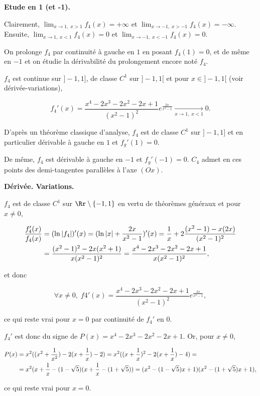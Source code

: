{\begin{enumerate}
{{{{\textbf{Etude en 1 (et -1).}

Clairement, $\lim_{x\rightarrow 1,\;x>1}f_4(x)=+\infty$ et $\lim_{x\rightarrow -1,\;x>-1}f_4(x)=-\infty$. Ensuite, $\lim_{x\rightarrow 1,\;x<1}f_4(x)=0$ et $\lim_{x\rightarrow -1,\;x<-1}f_4(x)=0$.

On prolonge $f_4$ par continuité à gauche en $1$ en posant $f_4(1)=0$, et de même en $-1$ et on étudie la dérivabilité du prolongement encore noté $f_4$.

$f_4$ est continue sur $]-1,1]$, de classe $C^1$ sur $]-1,1[$ et pour $x\in]-1,1[$ (voir dérivée-variations), 

$$f_4'(x)=\frac{x^4-2x^3-2x^2-2x+1}{(x^2-1)^2}e^{\frac{2x}{x^2-1}}\underset{x\rightarrow1,\;x<1}{\rightarrow}0.$$

D'après un théorème classique d'analyse, $f_4$ est de classe $C^1$ sur $]-1,1]$ et en particulier dérivable à gauche en $1$ et $f_g'(1)=0$.

De même, $f_4$ est dérivable à gauche en $-1$ et $f_g'(-1)=0$. $C_4$ admet en ces points des demi-tangentes parallèles à l'axe $(Ox)$.

\textbf{Dérivée. Variations.}

$f_4$ est de classe $C^1$ sur $\Rr\setminus\{-1,1\}$ en vertu de théorèmes généraux et pour $x\neq 0$,

\begin{align*}\ensuremath
\frac{f_4'(x)}{f_4(x)}&=(\ln|f_4|)'(x)=(\ln|x|+\frac{2x}{x^2-1})'(x)=\frac{1}{x}+2\frac{(x^2-1)-x(2x)}{(x^2-1)^2}\\
 &=\frac{(x^2-1)^2-2x(x^2+1)}{x(x^2-1)^2}=\frac{x^4-2x^3-2x^2-2x+1}{x(x^2-1)^2},
\end{align*}
 
et donc 

$$\forall x\neq 0,\;f4'(x)=\frac{x^4-2x^3-2x^2-2x+1}{(x^2-1)^2}e^{\frac{2x}{x^2-1}},$$

ce qui reste vrai pour $x=0$ par continuité de $f_4'$ en $0$.

$f_4'$ est donc du signe de $P(x)=x^4-2x^3-2x^2-2x+1$. Or, pour $x\neq0$,

\begin{align*}\ensuremath 
P(x)&=x^2((x^2+\frac{1}{x^2})-2(x+\frac{1}{x})-2)=x^2((x+\frac{1}{x})^2-2(x+\frac{1}{x})-4)=\\
 &=x^2(x+\frac{1}{x}-(1-\sqrt{5})(x+\frac{1}{x}-(1+\sqrt{5}))=(x^2-(1-\sqrt{5})x+1)(x^2-(1+\sqrt{5})x+1),
\end{align*}

ce qui reste vrai pour $x=0$.

}}}}
\end{enumerate}}
